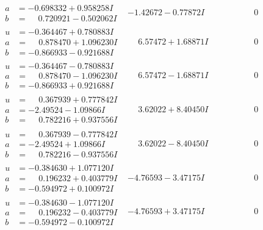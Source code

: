 \documentclass[1p]{elsarticle_modified}
\theoremstyle{definition}
\begin{document}
$$\begin{array}{c|c|c}
\begin{aligned}
a &= -0.698332 + 0.958258 I \\
b &= \phantom{-}0.720921 - 0.502062 I\end{aligned}
 & -1.42672 - 0.77872 I & \phantom{-0.000000 } 0 \\ \hline\begin{aligned}
u &= -0.364467 + 0.780883 I \\
a &= \phantom{-}0.878470 + 1.096230 I \\
b &= -0.866933 - 0.921688 I\end{aligned}
 & \phantom{-}6.57472 + 1.68871 I & \phantom{-0.000000 } 0 \\ \hline\begin{aligned}
u &= -0.364467 - 0.780883 I \\
a &= \phantom{-}0.878470 - 1.096230 I \\
b &= -0.866933 + 0.921688 I\end{aligned}
 & \phantom{-}6.57472 - 1.68871 I & \phantom{-0.000000 } 0 \\ \hline\begin{aligned}
u &= \phantom{-}0.367939 + 0.777842 I \\
a &= -2.49524 - 1.09866 I \\
b &= \phantom{-}0.782216 + 0.937556 I\end{aligned}
 & \phantom{-}3.62022 + 8.40450 I & \phantom{-0.000000 } 0 \\ \hline\begin{aligned}
u &= \phantom{-}0.367939 - 0.777842 I \\
a &= -2.49524 + 1.09866 I \\
b &= \phantom{-}0.782216 - 0.937556 I\end{aligned}
 & \phantom{-}3.62022 - 8.40450 I & \phantom{-0.000000 } 0 \\ \hline\begin{aligned}
u &= -0.384630 + 1.077120 I \\
a &= \phantom{-}0.196232 + 0.403779 I \\
b &= -0.594972 + 0.100972 I\end{aligned}
 & -4.76593 - 3.47175 I & \phantom{-0.000000 } 0 \\ \hline\begin{aligned}
u &= -0.384630 - 1.077120 I \\
a &= \phantom{-}0.196232 - 0.403779 I \\
b &= -0.594972 - 0.100972 I\end{aligned}
 & -4.76593 + 3.47175 I & \phantom{-0.000000 } 0\\

\end{array}$$
\end{document}
